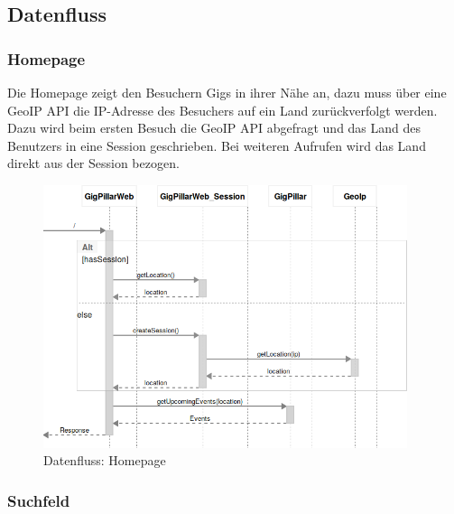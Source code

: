 \subsection{Datenfluss}\label{datenfluss}

\subsubsection{Homepage}\label{datenfluss-homepage}

Die Homepage zeigt den Besuchern Gigs in ihrer Nähe an, dazu muss über eine
GeoIP API die IP-Adresse des Besuchers auf ein Land zurückverfolgt werden.
Dazu wird beim ersten Besuch die GeoIP API abgefragt und das Land des Benutzers
in eine Session geschrieben. Bei weiteren Aufrufen wird das Land direkt aus der
Session bezogen.

%
%

\begin{figure}[!htb]
  \centering
  \includegraphics[width=0.95\textwidth]{konzept/datenfluss-homepage.png}
  \caption{Datenfluss: Homepage}
\end{figure}

\clearpage
\subsubsection{Suchfeld}\label{datenfluss-suchfeld}

